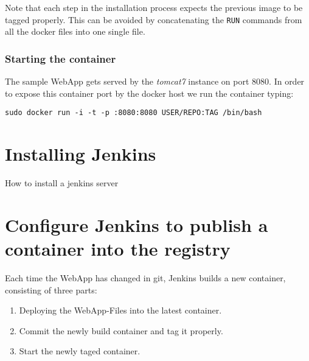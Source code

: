 \documentclass[11pt]{article}
\begin{document}
Note that each step in the installation process expects the previous image to be tagged properly. This can be avoided by concatenating the \texttt{RUN} commands from all the docker files into one single file.
\subsubsection{Starting the container}
\label{sec-3-5-2}

The sample WebApp gets served by the \emph{tomcat7} instance on port 8080. In order to expose this container port by the docker host we run the container  typing:

\begin{verbatim}
sudo docker run -i -t -p :8080:8080 USER/REPO:TAG /bin/bash
\end{verbatim}
\section{Installing Jenkins}
\label{sec-4}

How to install a jenkins server
\section{Configure Jenkins to publish a container into the registry}
\label{sec-5}


Each time the WebApp has changed in git, Jenkins builds a new container,  consisting of three parts:
\begin{enumerate}
\item Deploying the WebApp-Files into the latest container.
\item Commit the newly build container and tag it properly.
\item Start the newly taged container.
\end{enumerate}
\end{document}
